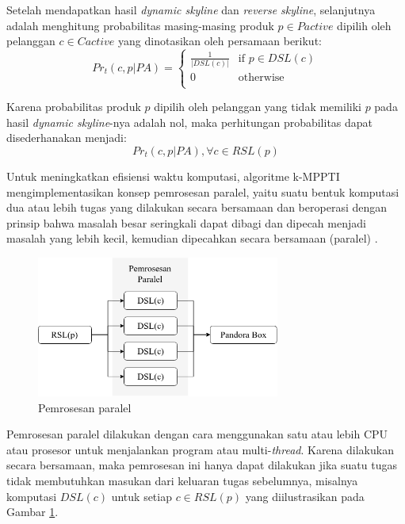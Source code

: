 \pagebreak
{}

Setelah mendapatkan hasil \textit{dynamic skyline} dan \textit{reverse skyline}, selanjutnya adalah menghitung probabilitas masing-masing produk $p \in P{active}$ dipilih oleh pelanggan $c \in C{active}$ yang dinotasikan oleh persamaan berikut:
\begin{equation}\label{eq:prob-ti}
Pr_t(c, p|PA) = \left\{
						\begin{array}{ll}
						\frac{1}{|DSL(c)|} & \text{if } p \in DSL(c)\\
						0 & \text{otherwise}\\
						\end{array}
						\right.
\end{equation}

Karena probabilitas produk $p$ dipilih oleh pelanggan yang tidak memiliki $p$ pada hasil \textit{dynamic skyline}-nya adalah nol, maka perhitungan probabilitas dapat disederhanakan menjadi:
\begin{equation}\label{eq:prob-ti-rsl}
Pr_t(c, p|PA), \forall c \in RSL(p)
\end{equation}


Untuk meningkatkan efisiensi waktu komputasi, algoritme k-MPPTI mengimplementasikan konsep pemrosesan paralel, yaitu suatu bentuk komputasi dua atau lebih tugas yang dilakukan secara bersamaan dan beroperasi dengan prinsip bahwa masalah besar seringkali dapat dibagi dan dipecah menjadi masalah yang lebih kecil, kemudian dipecahkan secara bersamaan (paralel) \cite{paralel}. 

\begin{figure}[h]
	\centering
	\includegraphics[width=8cm]{assets/img/bab3/paralel.png}
	\caption{Pemrosesan paralel}
	\label{fig:paralel}
\end{figure}

Pemrosesan paralel dilakukan dengan cara menggunakan satu atau lebih CPU atau prosesor untuk menjalankan program atau multi-\textit{thread}. Karena dilakukan secara bersamaan, maka pemrosesan ini hanya dapat dilakukan jika suatu tugas tidak membutuhkan masukan dari keluaran tugas sebelumnya, misalnya komputasi $DSL(c)$ untuk setiap $c \in RSL(p)$ yang diilustrasikan pada Gambar \ref{fig:paralel}.

